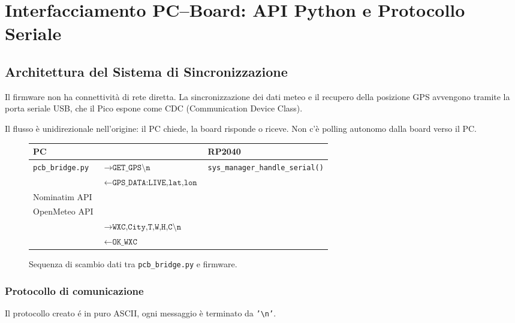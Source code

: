 
\newpage

\section{Interfacciamento PC--Board: API Python e Protocollo Seriale}


\subsection{Architettura del Sistema di Sincronizzazione}

Il firmware non ha connettività di rete diretta. La sincronizzazione dei dati meteo e il recupero della posizione
GPS avvengono tramite la porta seriale USB, che il Pico espone come CDC
(Communication Device Class).

Il flusso è unidirezionale nell'origine: il PC chiede, la board risponde o
riceve. Non c'è polling autonomo dalla board verso il PC.

\begin{figure}[h]
	\centering
	\begin{tabular}{lll}
		\textbf{PC} & & \textbf{RP2040} \\
		\hline
		\texttt{pcb\_bridge.py} & $\rightarrow{\texttt{GET\_GPS\textbackslash n}}$ & \texttt{sys\_manager\_handle\_serial()} \\
		& $\leftarrow{\texttt{GPS\_DATA:LIVE,lat,lon}}$ & \\
		Nominatim API & & \\
		OpenMeteo API & & \\
		& $\rightarrow{\texttt{WXC,City,T,W,H,C\textbackslash n}}$ & \\
		& $\leftarrow{\texttt{OK\_WXC}}$ & \\
	\end{tabular}
	\caption{Sequenza di scambio dati tra \texttt{pcb\_bridge.py} e firmware.}
\end{figure}

\subsubsection{Protocollo di comunicazione}

Il protocollo creato é in puro ASCII, ogni messaggio è terminato da \texttt{'\textbackslash n'}.

